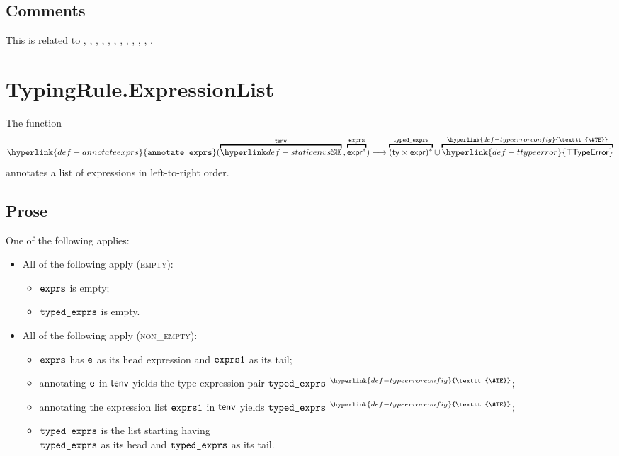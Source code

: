 \documentclass{book}
\newcommand\TTypeError[0]{\hyperlink{def-ttypeerror}{\textsf{TTypeError}}}
\newcommand\TypeErrorConfig[0]{\hyperlink{def-typeerrorconfig}{\texttt{\#TE}}}
\newcommand\ProseOrTypeError[0]{\hyperlink{def-proseortypeerror}{$^{\TypeErrorConfig}$}}
\newcommand\annotateexprlist[1]{\hyperlink{def-annotateexprs}{\texttt{annotate\_exprs}}(#1)}
\begin{document}
\subsection{Comments}
  This is related to , , , ,
  , , , , ,
  , , .

\section{TypingRule.ExpressionList \label{sec:TypingRule.ExpressionList}}
\hypertarget{def-annotateexprs}{}
The function
\[
  \annotateexprlist{\overname{\staticenvs}{\tenv} \aslsep \overname{\expr^*}{\exprs}}
  \aslto \overname{(\ty \times \expr)^*}{\typedexprs}
  \cup \overname{\TTypeError}{\TypeErrorConfig}
\]
annotates a list of expressions in left-to-right order.

\subsection{Prose}
One of the following applies:
\begin{itemize}
  \item All of the following apply (\textsc{empty}):
  \begin{itemize}
    \item $\texttt{exprs}$ is empty;
    \item $\texttt{typed\_exprs}$ is empty.
  \end{itemize}

  \item All of the following apply (\textsc{non\_empty}):
  \begin{itemize}
    \item $\texttt{exprs}$ has $\texttt{e}$ as its head expression and $\texttt{exprs1}$ as its tail;
    \item annotating $\texttt{e}$ in $\textsf{tenv}$ yields the type-expression pair
    $\texttt{typed\_exprs}$ \ProseOrTypeError;
    \item annotating the expression list $\texttt{exprs1}$ in $\textsf{tenv}$ yields
    $\texttt{typed\_exprs}$ \ProseOrTypeError;
    \item $\texttt{typed\_exprs}$ is the list starting having \\ $\texttt{typed\_exprs}$ as its head
    and $\texttt{typed\_exprs}$ as its tail.
  \end{itemize}
\end{itemize}
\end{document}
